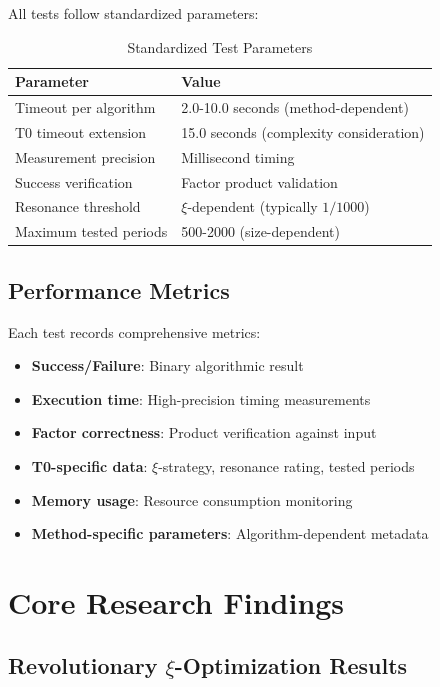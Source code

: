 	All tests follow standardized parameters:
	\begin{table}[H]
		\centering
		\caption{Standardized Test Parameters}
		\begin{tabular}{ll}
			\toprule
			\textbf{Parameter} & \textbf{Value} \\
			\midrule
			Timeout per algorithm & 2.0-10.0 seconds (method-dependent) \\
			T0 timeout extension & 15.0 seconds (complexity consideration) \\
			Measurement precision & Millisecond timing \\
			Success verification & Factor product validation \\
			Resonance threshold & $\xi$-dependent (typically $1/1000$) \\
			Maximum tested periods & 500-2000 (size-dependent) \\
			\bottomrule
		\end{tabular}
	\end{table}
	
	\subsection{Performance Metrics}
	
	Each test records comprehensive metrics:
	\begin{itemize}
		\item \textbf{Success/Failure}: Binary algorithmic result
		\item \textbf{Execution time}: High-precision timing measurements
		\item \textbf{Factor correctness}: Product verification against input
		\item \textbf{T0-specific data}: $\xi$-strategy, resonance rating, tested periods
		\item \textbf{Memory usage}: Resource consumption monitoring
		\item \textbf{Method-specific parameters}: Algorithm-dependent metadata
	\end{itemize}
	
	\section{Core Research Findings}
	
	\subsection{Revolutionary $\xi$-Optimization Results}
	
